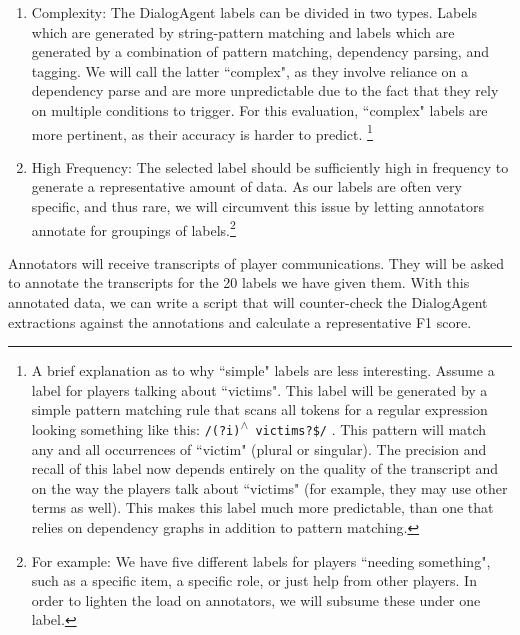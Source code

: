 \begin{enumerate}

\item Complexity: The DialogAgent labels can be divided in two types. Labels
    which are generated by string-pattern matching and labels which are
    generated by a combination of pattern matching, dependency parsing, and
    tagging. We will call the latter ``complex", as they involve reliance on a
    dependency parse and are more unpredictable due to the fact that they rely
    on multiple conditions to trigger. For this evaluation, ``complex" labels
    are more pertinent, as their accuracy is harder to predict. \footnote{A
        brief explanation as to why ``simple" labels are less interesting.
        Assume a label for players talking about ``victims". This label will be
        generated by a simple pattern matching rule that scans all tokens for a
        regular expression looking something like this: 
               \texttt{/(?i){\textsuperscript{$\wedge$} }victims?\$/}
        .  This pattern will match any and all occurrences of
        ``victim" (plural or singular). The precision and recall of this label
        now depends entirely on the quality of the transcript and on the way
        the players talk about ``victims" (for example, they may use other
        terms as well). This makes this label much more predictable, than one
        that relies on dependency graphs in addition to pattern matching.}

\item High Frequency: The selected label should be sufficiently high in
    frequency to generate a representative amount of data. As our labels are
    often very specific, and thus rare, we will circumvent this issue by
    letting annotators annotate for groupings of labels.\footnote{For example:
    We have five different labels for players ``needing something", such as a
specific item, a specific role, or just help from other players. In order to
lighten the load on annotators, we will subsume these under one label.}

\end{enumerate}

Annotators will receive transcripts of player communications. They will be
asked to annotate the transcripts for the 20 labels we have given them. With
this annotated data, we can write a script that will counter-check the
DialogAgent extractions against the annotations and calculate a representative
F1 score.



